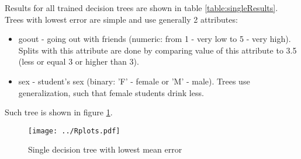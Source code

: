 \documentclass[a4paper]{article}
\begin{document}
\begin{multicols}{2}
Results for all trained decision trees are shown in table \ref{table:singleResults}.
Trees with lowest error are simple and use generally 2 attributes:
\begin{itemize}
    \item goout - going out with friends (numeric: from 1 - very low to 5 - very high).
        Splits with this attribute are done by comparing value of this attribute to 3.5
        (less or equal 3 or higher than 3).
    \item sex - student's sex (binary: 'F' - female or 'M' - male).
        Trees use generalization, such that female students drink less.
\end{itemize}
Such tree is shown in figure \ref{fig:single}.

\begin{figure}[H]
    \centering
    \texttt{[image: ../Rplots.pdf]}
    \label{fig:single}
    \caption[]{Single decision tree with lowest mean error}
\end{figure}

% 
% 
% 

\end{multicols}
\end{document}
